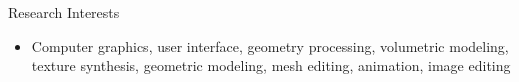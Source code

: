 {\Large\sc Research Interests}
\vspace{-3mm}
\begin{itemize}
\item Computer graphics, user interface, geometry processing, volumetric modeling, texture synthesis, geometric modeling, mesh editing, animation, image editing
\end{itemize}
